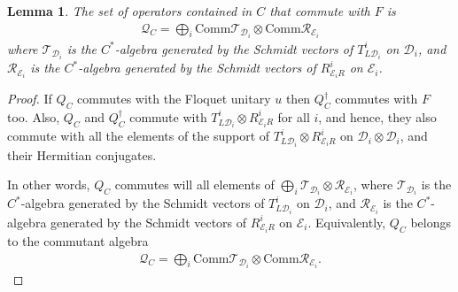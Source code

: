 \documentclass[11pt, twocolumn, floatfix, superscriptaddress, aps, prb, raggedbottom]{revtex4-2}
\newtheorem{lemma}[theorem]{Lemma}
\begin{document}
\begin{lemma}
  The set of operators contained in $C$ that commute with $F$ is
  \begin{align}
      \mathcal Q_C = \bigoplus_i \mathrm{Comm}\mathcal T_{\mathcal D_i} \otimes \mathrm{Comm}\mathcal R_{\mathcal E_i}
  \end{align}
  where $\mathcal T_{\mathcal D_i}$ is the $C^*$-algebra generated by the Schmidt vectors of $T^i_{L \mathcal D_i}$ on $\mathcal D_i$, and $\mathcal R_{\mathcal E_i}$ is the $C^*$-algebra generated by the Schmidt vectors of $R^i_{\mathcal E_i R}$ on $\mathcal E_i$.
\end{lemma}
\begin{proof}
  If $Q_C$ commutes with the Floquet unitary $u$ then $Q_C^\dagger$ commutes with $F$ too. Also, $Q_C$ and $Q_C^\dagger$ commute with $T^i_{L \mathcal D_i} \otimes R^i_{\mathcal E_i R}$ for all $i$, and hence, they also commute with all the elements of the support of $T^i_{L \mathcal D_i} \otimes R^i_{\mathcal E_i R}$ on $\mathcal D_i \otimes\mathcal D_i$, and their Hermitian conjugates.

  In other words, $Q_C$ commutes will all elements of $\bigoplus_i \mathcal T_{\mathcal D_i} \otimes \mathcal R_{\mathcal E_i}$, where $\mathcal T_{\mathcal D_i}$ is the $C^*$-algebra generated by the Schmidt vectors of $T^i_{L \mathcal D_i}$ on $\mathcal D_i$, and $\mathcal R_{\mathcal E_i}$ is the $C^*$-algebra generated by the Schmidt vectors of $R^i_{\mathcal E_i R}$ on $\mathcal E_i$. Equivalently, $Q_C$ belongs to the commutant algebra
  \begin{align}
      \mathcal Q_C = \bigoplus_i \mathrm{Comm}\mathcal T_{\mathcal D_i} \otimes \mathrm{Comm}\mathcal R_{\mathcal E_i}.
  \end{align}
\end{proof}
\end{document}
